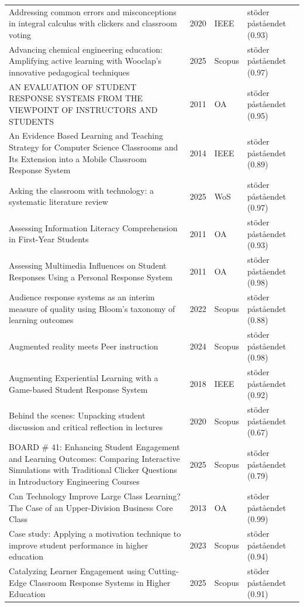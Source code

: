 \begin{longtable}{@{}%
  >{\raggedright\arraybackslash}p{}c%
  >{\raggedright\arraybackslash}p{}%
  >{\raggedright\arraybackslash}p{}@{}}
Addressing common errors and misconceptions in integral calculus with clickers and classroom voting & 2020 & IEEE & stöder påståendet (0.93) \\
Advancing chemical engineering education: Amplifying active learning with Wooclap's innovative pedagogical techniques & 2025 & Scopus & stöder påståendet (0.97) \\
AN EVALUATION OF STUDENT RESPONSE SYSTEMS FROM THE VIEWPOINT OF INSTRUCTORS AND STUDENTS & 2011 & OA & stöder påståendet (0.95) \\
An Evidence Based Learning and Teaching Strategy for Computer Science Classrooms and Its Extension into a Mobile Classroom Response System & 2014 & IEEE & stöder påståendet (0.89) \\
Asking the classroom with technology: a systematic literature review & 2025 & WoS & stöder påståendet (0.97) \\
Assessing Information Literacy Comprehension in First-Year Students & 2011 & OA & stöder påståendet (0.93) \\
Assessing Multimedia Influences on Student Responses Using a Personal Response System & 2011 & OA & stöder påståendet (0.98) \\
Audience response systems as an interim measure of quality using Bloom's taxonomy of learning outcomes & 2022 & Scopus & stöder påståendet (0.88) \\
Augmented reality meets Peer instruction & 2024 & Scopus & stöder påståendet (0.98) \\
Augmenting Experiential Learning with a Game-based Student Response System & 2018 & IEEE & stöder påståendet (0.92) \\
Behind the scenes: Unpacking student discussion and critical reflection in lectures & 2020 & Scopus & stöder påståendet (0.67) \\
BOARD \# 41: Enhancing Student Engagement and Learning Outcomes: Comparing Interactive Simulations with Traditional Clicker Questions in Introductory Engineering Courses & 2025 & Scopus & stöder påståendet (0.79) \\
Can Technology Improve Large Class Learning? The Case of an Upper-Division Business Core Class & 2013 & OA & stöder påståendet (0.99) \\
Case study: Applying a motivation technique to improve student performance in higher education & 2023 & Scopus & stöder påståendet (0.94) \\
Catalyzing Learner Engagement using Cutting-Edge Classroom Response Systems in Higher Education & 2025 & Scopus & stöder påståendet (0.91) \\

\end{longtable}
